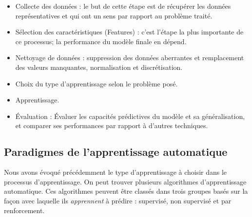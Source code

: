 \begin{itemize}
    \item Collecte des données : le but de cette étape est de récupérer les données représentatives et qui ont un sens par rapport au problème traité.
    \item Sélection des caractéristiques (Features) : c'est l'étape la plus importante de ce processus; la performance du modèle finale en dépend.
    \item Nettoyage de données : suppression des données aberrantes et remplacement des valeurs manquantes, normalisation et discrétisation.
    \item Choix du type d'apprentissage selon le problème posé.
    \item Apprentissage.
    \item Évaluation : Évaluer les capacités prédictives du modèle et sa généralisation, et comparer ses performances par rapport à d'autres techniques.
\end{itemize}

\subsection{Paradigmes de l'apprentissage automatique}
Nous avons évoqué précédemment le type d'apprentissage à choisir dans le processus d'apprentissage. On peut trouver plusieurs algorithmes d'apprentissage automatique. Ces algorithmes peuvent être classés dans trois groupes basés sur la façon avec laquelle ils \emph{apprennent} à prédire : supervisé, non supervisé et par renforcement.

